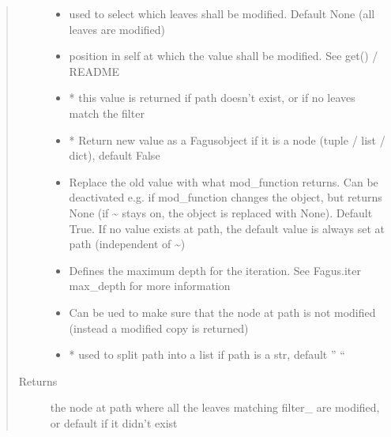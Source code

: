 \documentclass[a4paper,10pt,english]{sphinxmanual}
\begin{document}
\begin{fulllineitems}
\begin{fulllineitems}
\begin{quote}
\begin{description}
\begin{itemize}
\item {}
\sphinxAtStartPar
{} \textendash{} used to select which leaves shall be modified. Default None (all leaves are modified)

\item {}
\sphinxAtStartPar
{} \textendash{} position in self at which the value shall be modified. See get() / README

\item {}
\sphinxAtStartPar
{} \textendash{} * this value is returned if path doesn’t exist, or if no leaves match the filter

\item {}
\sphinxAtStartPar
{} \textendash{} * Return new value as a Fagus\sphinxhyphen{}object if it is a node (tuple / list / dict), default False

\item {}
\sphinxAtStartPar
{} \textendash{} Replace the old value with what mod\_function returns. Can be deactivated e.g. if mod\_function
changes the object, but returns None (if \textasciitilde{} stays on, the object is replaced with None). Default True.
If no value exists at path, the default value is always set at path (independent of \textasciitilde{})

\item {}
\sphinxAtStartPar
{} \textendash{} Defines the maximum depth for the iteration. See Fagus.iter max\_depth for more information

\item {}
\sphinxAtStartPar
{} \textendash{} Can be ued to make sure that the node at path is not modified (instead a modified copy is returned)

\item {}
\sphinxAtStartPar
{} \textendash{} * used to split path into a list if path is a str, default ” “

\end{itemize}

\item[{Returns}] \leavevmode
\sphinxAtStartPar
the node at path where all the leaves matching filter\_ are modified, or default if it didn’t exist


\end{description}
\end{quote}
\end{fulllineitems}
\end{fulllineitems}
\end{document}
